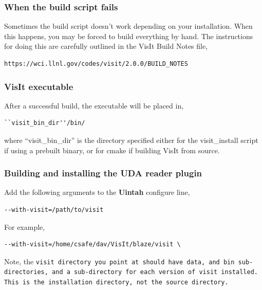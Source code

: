 \documentclass[12pt]{article}
\begin{document}
\subsubsection{When the build script fails}
\label{sec:WhenTheBuildsSriptFails}

Sometimes the build script doesn't work depending on your
installation. When this happens, you may be forced to build everything
by hand. The instructions for doing this are carefully outlined in the
VisIt Build Notes file,

\begin{verbatim}
https://wci.llnl.gov/codes/visit/2.0.0/BUILD_NOTES
\end{verbatim}

\subsubsection{VisIt executable}
\label{sec:VisItExecutable}

After a successful build, the executable will be placed in,

\begin{verbatim}
``visit_bin_dir''/bin/
\end{verbatim}

where ``visit\_bin\_dir'' is the directory specified either for the
visit\_install script if using a prebuilt binary, or for cmake if
building VisIt from source.

\subsubsection{Building and installing the UDA reader plugin}
\label{sec:BuildingAndInstallingUDAPlugin}

Add the following arguments to the \textbf{Uintah} configure line,

\begin{verbatim}
--with-visit=/path/to/visit
\end{verbatim}

For example,

\begin{verbatim}
--with-visit=/home/csafe/dav/VisIt/blaze/visit \
\end{verbatim}

Note, the \tt visit \normalfont directory you point at should
have \tt data\normalfont , and \tt bin \normalfont sub-directories,
and a sub-directory for each version of visit installed.  This is the
installation directory, not the source directory.
\end{document}
